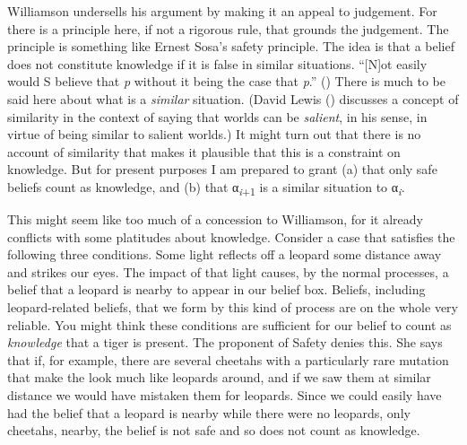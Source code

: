 \documentclass[
  11pt,
  letterpaper,
  DIV=11,
  numbers=noendperiod,
  twoside]{scrartcl}
\begin{document}
Williamson undersells his argument by making it an appeal to judgement.
For there is a principle here, if not a rigorous rule, that grounds the
judgement. The principle is something like Ernest Sosa's safety
principle. The idea is that a belief does not constitute knowledge if it
is false in similar situations. ``{[}N{]}ot easily would S believe that
\emph{p} without it being the case that \emph{p}.''
() There is much to be said here
about what is a \emph{similar} situation. (David Lewis
() discusses a concept of similarity in
the context of saying that worlds can be \emph{salient}, in his sense,
in virtue of being similar to salient worlds.) It might turn out that
there is no account of similarity that makes it plausible that this is a
constraint on knowledge. But for present purposes I am prepared to grant
(a) that only safe beliefs count as knowledge, and (b) that
α\textsubscript{\emph{i}+1} is a similar situation to
α\textsubscript{\emph{i}}.

This might seem like too much of a concession to Williamson, for it
already conflicts with some platitudes about knowledge. Consider a case
that satisfies the following three conditions. Some light reflects off a
leopard some distance away and strikes our eyes. The impact of that
light causes, by the normal processes, a belief that a leopard is nearby
to appear in our belief box. Beliefs, including leopard-related beliefs,
that we form by this kind of process are on the whole very reliable. You
might think these conditions are sufficient for our belief to count as
\emph{knowledge} that a tiger is present. The proponent of Safety denies
this. She says that if, for example, there are several cheetahs with a
particularly rare mutation that make the look much like leopards around,
and if we saw them at similar distance we would have mistaken them for
leopards. Since we could easily have had the belief that a leopard is
nearby while there were no leopards, only cheetahs, nearby, the belief
is not safe and so does not count as knowledge.
\end{document}
